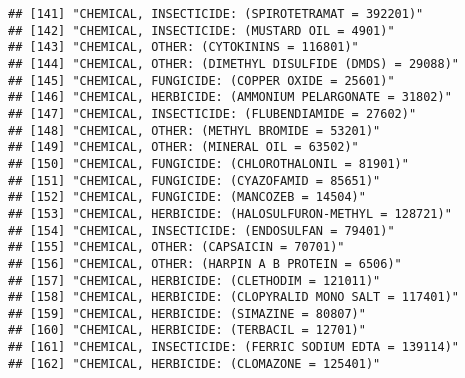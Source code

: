 \documentclass[
]{article}
\begin{document}
\begin{verbatim}
## [141] "CHEMICAL, INSECTICIDE: (SPIROTETRAMAT = 392201)"                                   
## [142] "CHEMICAL, INSECTICIDE: (MUSTARD OIL = 4901)"                                       
## [143] "CHEMICAL, OTHER: (CYTOKININS = 116801)"                                            
## [144] "CHEMICAL, OTHER: (DIMETHYL DISULFIDE (DMDS) = 29088)"                              
## [145] "CHEMICAL, FUNGICIDE: (COPPER OXIDE = 25601)"                                       
## [146] "CHEMICAL, HERBICIDE: (AMMONIUM PELARGONATE = 31802)"                               
## [147] "CHEMICAL, INSECTICIDE: (FLUBENDIAMIDE = 27602)"                                    
## [148] "CHEMICAL, OTHER: (METHYL BROMIDE = 53201)"                                         
## [149] "CHEMICAL, OTHER: (MINERAL OIL = 63502)"                                            
## [150] "CHEMICAL, FUNGICIDE: (CHLOROTHALONIL = 81901)"                                     
## [151] "CHEMICAL, FUNGICIDE: (CYAZOFAMID = 85651)"                                         
## [152] "CHEMICAL, FUNGICIDE: (MANCOZEB = 14504)"                                           
## [153] "CHEMICAL, HERBICIDE: (HALOSULFURON-METHYL = 128721)"                               
## [154] "CHEMICAL, INSECTICIDE: (ENDOSULFAN = 79401)"                                       
## [155] "CHEMICAL, OTHER: (CAPSAICIN = 70701)"                                              
## [156] "CHEMICAL, OTHER: (HARPIN A B PROTEIN = 6506)"                                      
## [157] "CHEMICAL, HERBICIDE: (CLETHODIM = 121011)"                                         
## [158] "CHEMICAL, HERBICIDE: (CLOPYRALID MONO SALT = 117401)"                              
## [159] "CHEMICAL, HERBICIDE: (SIMAZINE = 80807)"                                           
## [160] "CHEMICAL, HERBICIDE: (TERBACIL = 12701)"                                           
## [161] "CHEMICAL, INSECTICIDE: (FERRIC SODIUM EDTA = 139114)"                              
## [162] "CHEMICAL, HERBICIDE: (CLOMAZONE = 125401)"
\end{verbatim}
\end{document}
